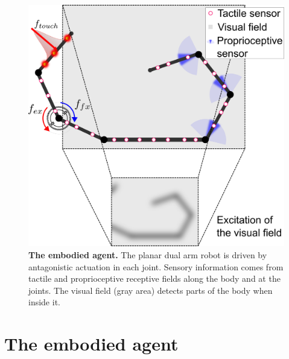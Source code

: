 \begin{figure}[!t]
	\begin{center}
		\hspace*{\fill}
		\includegraphics[width=0.99\columnwidth]{extended_planar_dual_arm_with_vision_v2.png}
		\hspace*{\fill}
	\end{center}
	\caption{\label{fig:extended_dual_arm_robot} \textbf{The embodied agent.} The planar dual arm robot is driven by antagonistic actuation in each joint. Sensory information comes from tactile and proprioceptive receptive fields along the body and at the joints. The visual field (gray area) detects parts of the body when inside it.}
\end{figure}

\section{The embodied agent}\label{sec:the_embidied_agent}
